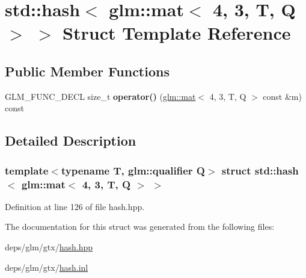 \hypertarget{structstd_1_1hash_3_01glm_1_1mat_3_014_00_013_00_01T_00_01Q_01_4_01_4}{}\section{std\+:\+:hash$<$ glm\+:\+:mat$<$ 4, 3, T, Q $>$ $>$ Struct Template Reference}
\label{structstd_1_1hash_3_01glm_1_1mat_3_014_00_013_00_01T_00_01Q_01_4_01_4}
\subsection*{Public Member Functions}
\begin{DoxyCompactItemize}
\item 
\mbox{\label{structstd_1_1hash_3_01glm_1_1mat_3_014_00_013_00_01T_00_01Q_01_4_01_4_afc844f3ac72bec59550270a63e8eb9aa}} 
G\+L\+M\+\_\+\+F\+U\+N\+C\+\_\+\+D\+E\+CL size\+\_\+t {\bfseries operator()} (\hyperlink{structglm_1_1mat}{glm\+::mat}$<$ 4, 3, T, Q $>$ const \&m) const
\end{DoxyCompactItemize}


\subsection{Detailed Description}
\subsubsection*{template$<$typename T, glm\+::qualifier Q$>$\newline
struct std\+::hash$<$ glm\+::mat$<$ 4, 3, T, Q $>$ $>$}



Definition at line 126 of file hash.\+hpp.



The documentation for this struct was generated from the following files\+:\begin{DoxyCompactItemize}
\item 
deps/glm/gtx/\hyperlink{hash_8hpp}{hash.\+hpp}\item 
deps/glm/gtx/\hyperlink{hash_8inl}{hash.\+inl}\end{DoxyCompactItemize}
